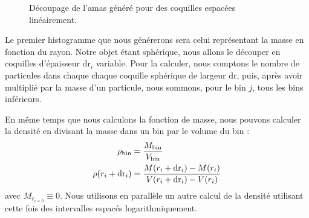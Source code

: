 			\begin{wrapfigure}{l}{0.40\textwidth}
				\begin{center}
				\end{center}
				\caption{Découpage de l'amas généré pour des coquilles espacées linéairement.\label{schema::bin}}
			\end{wrapfigure}
			Le premier histogramme que nous générerons sera celui
			représentant la masse en fonction du rayon. Notre objet
			étant sphérique, nous allons le découper en coquilles d'épaisseur
			$\mathrm{dr}_i$ variable.
			Pour la calculer, nous comptons
			le nombre de particules dans chaque chaque coquille
			sphérique de largeur $\mathrm{dr}$, puis, après avoir
			multiplié par la masse d'un particule, nous sommons,
			pour le bin $j$, tous les bins inférieurs.

			En même temps que nous calculons la fonction de masse, nous pouvons calculer la
			densité en divisant la masse dans un bin par le volume du bin :
			\begin{align}
				\rho_\mathrm{bin} &= \dfrac{M_\mathrm{bin}}{V_\mathrm{bin}} \notag \\
				\rho(r_i + \mathrm{dr}_i) &= \dfrac{M(r_i + \mathrm{dr}_i) - M(r_i)}{V(r_i + \mathrm{dr}_i) - V(r_i)}
			\end{align}
			avec $M_{r_{i=0}} \equiv 0$. Nous utilisons en parallèle un autre calcul de la densité utilisant
			cette fois des intervalles espacés logarithmiquement.


